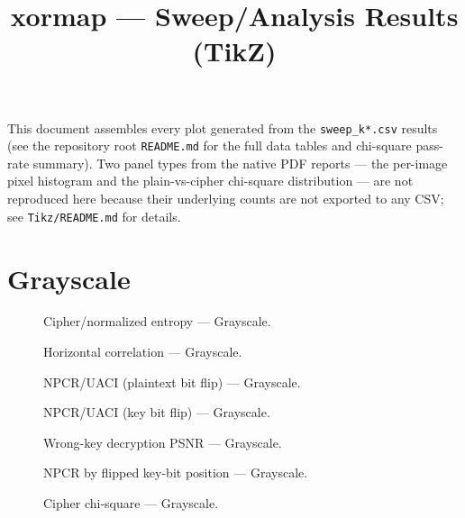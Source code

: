 \documentclass{article}
\title{xormap --- Sweep/Analysis Results (TikZ)}
\author{}
\date{}
\begin{document}
\maketitle
\noindent This document assembles every plot generated from the
\texttt{sweep\_k*.csv} results (see the repository root \texttt{README.md}
for the full data tables and chi-square pass-rate summary). Two panel
types from the native PDF reports --- the per-image pixel histogram and
the plain-vs-cipher chi-square distribution --- are not reproduced here
because their underlying counts are not exported to any CSV; see
\texttt{Tikz/README.md} for details.

\section{Grayscale}
\begin{figure}[htbp]
  \centering
  
  \caption{Cipher/normalized entropy --- Grayscale.}
\end{figure}

\begin{figure}[htbp]
  \centering
  
  \caption{Horizontal correlation --- Grayscale.}
\end{figure}

\begin{figure}[htbp]
  \centering
  
  \caption{NPCR/UACI (plaintext bit flip) --- Grayscale.}
\end{figure}

\begin{figure}[htbp]
  \centering
  
  \caption{NPCR/UACI (key bit flip) --- Grayscale.}
\end{figure}

\begin{figure}[htbp]
  \centering
  
  \caption{Wrong-key decryption PSNR --- Grayscale.}
\end{figure}

\begin{figure}[htbp]
  \centering
  
  \caption{NPCR by flipped key-bit position --- Grayscale.}
\end{figure}

\begin{figure}[htbp]
  \centering
  
  \caption{Cipher chi-square --- Grayscale.}
\end{figure}
\end{document}
